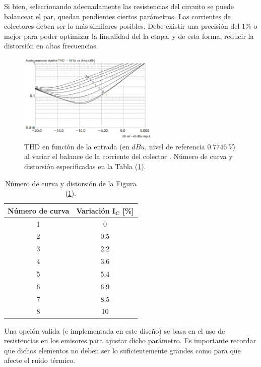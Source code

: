 Si bien, seleccionando adecuadamente las resistencias del circuito se puede balancear el par, quedan pendientes ciertos parámetros. Las corrientes de colectores deben ser lo más similares posibles. Debe existir una precisión del $1\%$ o mejor para poder optimizar la linealidad del la etapa, y de esta forma, reducir la distorsión en altas frecuencias.
\begin{figure}[H]
\centering
	\includegraphics[width=0.6\textwidth]{ImagenesInput-Stage/thd2.PNG}
	\caption{THD en función de la entrada (en $dBu$, nivel de referencia $0.7746 \ V$) al variar el balance de la corriente del colector . Número de curva y distorsión especificadas en la Tabla (\ref{tab:thd2}).}
	\label{fig:thd2}
\end{figure}

\begin{table}[H]
\centering
\begin{tabular}{cc}
\hline
\textbf{Número de curva} & \textbf{Variación $\mathbf{I_C}$ [\%]} \\ \hline
1                        & 0                    \\
2                        & 0.5                  \\
3                        & 2.2                  \\
4                        & 3.6                  \\
5                        & 5.4                  \\
6                        & 6.9                  \\
7                        & 8.5                  \\
8                        & 10             		\\
\hline
\end{tabular}
\caption{Número de curva y distorsión de la Figura (\ref{fig:thd2}).}
\label{tab:thd2}
\end{table}

Una opción valida (e implementada en este diseño) se basa en el uso de resistencias en los emisores para ajustar dicho parámetro. Es importante recordar que dichos elementos no deben ser lo suficientemente grandes como para que afecte el ruido térmico.

